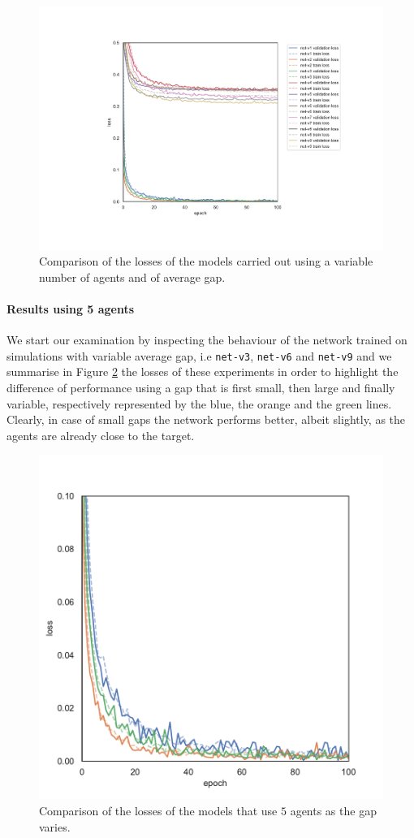 \begin{figure}[!htb]
	\centering
	\includegraphics[width=.8\textwidth]{contents/images/task2/loss-communication-all@}%
	\caption[Comparison of losses of the second set of experiments.]{Comparison 
		of the losses of the models carried out using a variable number of agents and 
		of average gap.}
	\label{fig:t2lossallt}
\end{figure}

\paragraph*{Results using 5 agents}

We start our examination by inspecting the behaviour of the network trained on 
simulations with variable average gap, i.e \texttt{net-v3}, \texttt{net-v6} and 
\texttt{net-v9} and we summarise in Figure \ref{fig:commlossn5t2} the losses of 
these experiments in order to highlight the difference of performance using a gap 
that is first small, then large and finally variable, respectively represented by the 
blue, the orange and the green lines.
Clearly, in case of small gaps the network performs better, albeit slightly, as the 
agents are already close to the target.

\begin{figure}[!htb]
	\centering
	\includegraphics[width=.5\textwidth]{contents/images/task2/loss-communication-N5}
	\caption{Comparison of the losses of the models that use $5$ agents as the gap 
		varies.}
	\label{fig:commlossn5t2}
\end{figure}

